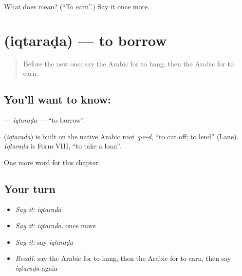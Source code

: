\begin{tcolorbox}[breakable,colback=teal!4,colframe=teal!35!black,title={Before you move on}]
What does  mean? (\textquotedblleft{}To earn\textquotedblright{}.) Say it once more.
\end{tcolorbox}
\section[\texorpdfstring{\ar{اقترض} (iqtaraḍa)}{اقترض (iqtaraḍa)}]{ (iqtaraḍa) — to borrow}

\label{lesson:AR-C224-iqtarada}



\begin{quote}
Before the new one: say the Arabic for to hang, then the Arabic for to earn.
\end{quote}

\subsection*{You'll want to know: }
\textbf{} — \emph{iqtaraḍa} — \textquotedblleft{}to borrow\textquotedblright{}.

\begin{cousinweb}
\textbf{} (\emph{iqtaraḍa}) is built on the native Arabic root \emph{q-r-ḍ}, \textquotedblleft{}to cut off; to lend\textquotedblright{} (Lane). \emph{Iqtaraḍa} is Form VIII, \textquotedblleft{}to take a loan\textquotedblright{}.
\end{cousinweb}

\begin{grammarlens}[title={What you've built}]
One more word for this chapter.
\end{grammarlens}

\subsection*{Your turn}
\begin{itemize}
\raggedright
  \item \emph{Say it:} \emph{iqtaraḍa}
  \item \emph{Say it:} \emph{iqtaraḍa}, once more
  \item \emph{Say it:} say \emph{iqtaraḍa}
  \item \emph{Recall:} say the Arabic for to hang, then the Arabic for to earn, then say \emph{iqtaraḍa} again
\end{itemize}

